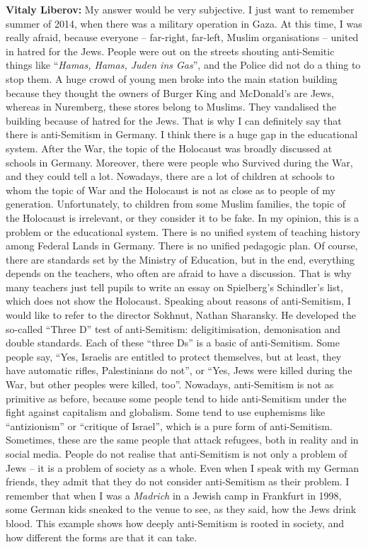 \textbf{Vitaly Liberov:} My answer would be very subjective. I just want to remember summer of 2014, when there was a military operation in Gaza. At this time, I was really afraid, because everyone – far-right, far-left, Muslim organisations – united in hatred for the Jews. People were out on the streets shouting anti-Semitic things like ``\textit{Hamas, Hamas, Juden ins Gas}'', and the Police did not do a thing to stop them. A huge crowd of young men broke into the main station building because they thought the owners of Burger King and McDonald’s are Jews, whereas in Nuremberg, these stores belong to Muslims. They vandalised the building because of hatred for the Jews. That is why I can definitely say that there is anti-Semitism in Germany. I think there is a huge gap in the educational system. After the War, the topic of the Holocaust was broadly discussed at schools in Germany. Moreover, there were people who Survived during the War, and they could tell a lot. Nowadays, there are a lot of children at schools to whom the topic of War and the Holocaust is not as close as to people of my generation. Unfortunately, to children from some Muslim families, the topic of the Holocaust is irrelevant, or they consider it to be fake. In my opinion, this is a problem or the educational system. There is no unified system of teaching history among Federal Lands in Germany. There is no unified pedagogic plan. Of course, there are standards set by the Ministry of Education, but in the end, everything depends on the teachers, who  often are afraid to have a discussion. That is why many teachers just tell pupils to write an essay on Spielberg’s Schindler’s list, which does not show the Holocaust. Speaking about reasons of anti-Semitism, I would like to refer to the director Sokhnut, Nathan Sharansky. He developed the so-called ``Three D'' test of anti-Semitism: deligitimisation, demonisation and double standards. Each of these ``three Ds'' is a basic of anti-Semitism. Some people say, ``Yes, Israelis are entitled to protect themselves, but at least, they have automatic rifles, Palestinians do not'', or ``Yes, Jews were killed during the War, but other peoples were killed, too''. Nowadays, anti-Semitism is not as primitive as before, because some people tend to hide anti-Semitism under the fight against capitalism and globalism. Some tend to use euphemisms like ``antizionism'' or ``critique of Israel'', which is a pure form of anti-Semitism. Sometimes, these are the same people that attack refugees, both in reality and in social media. People do not realise that anti-Semitism is not only a problem of Jews – it is a problem of society as a whole. Even when I speak with my German friends, they admit that they do not consider anti-Semitism as their problem. I remember that when I was a \textit{Madrich} in a Jewish camp in Frankfurt in 1998, some German kids sneaked to the venue to see, as they said, how the Jews drink blood. This example shows how deeply anti-Semitism is rooted in society, and how different the forms are that it can take.  

